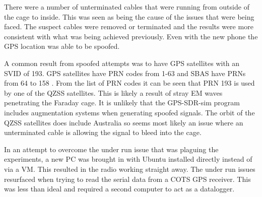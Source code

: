 There were a number of unterminated cables that were running from outside of the cage to inside. This was seen as being the cause of the issues that were being faced. The
suspect cables were removed or terminated and the results were more consistent with what was being achieved previously. Even with the new phone the GPS location was able
to be spoofed.

A common result from spoofed attempts was to have GPS satellites with an SVID of 193. GPS satellites have PRN codes from 1-63 and SBAS have PRNs from
64 to 158 \cite{RN67}. From the list of PRN codes \cite{RN67} it can be seen that PRN 193 is used by one of the QZSS satellites. This is likely a result of stray EM waves
penetrating the Faraday cage. It is unlikely that the GPS-SDR-sim program includes augmentation systems when generating spoofed signals. The orbit of the QZSS satellites
does include Australia so seems most likely an issue where an unterminated cable is allowing the signal to bleed into the cage.

In an attempt to overcome the under run issue that was plaguing the experiments, a new PC was brought in with Ubuntu installed directly instead of via a VM. This resulted
in the radio working straight away. The under run issues resurfaced when trying to read the serial data from a COTS GPS receiver. This was less than ideal and required a
second computer to act as a datalogger.
